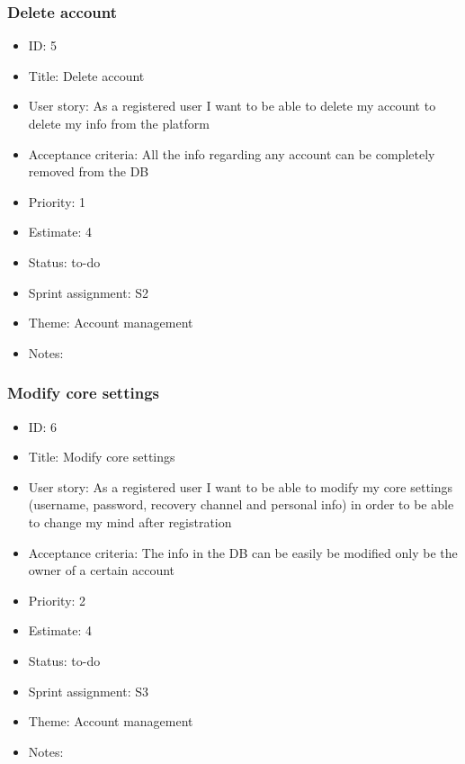 \subsubsection{Delete account}
\begin{itemize}
	\item ID: 5
	\item Title: Delete account
	\item User story: As a registered user I want to be able to delete my account to delete my info from the platform
	\item Acceptance criteria: All the info regarding any account can be completely removed from the DB
	\item Priority: 1
	\item Estimate: 4
	\item Status: to-do
	\item Sprint assignment: S2
	\item Theme: Account management
	\item Notes:
\end{itemize}

\subsubsection{Modify core settings}
\begin{itemize}
	\item ID: 6
	\item Title: Modify core settings
	\item User story: As a registered user I want to be able to modify my core settings (username, password, recovery channel and personal info) in order to be able to change my mind after registration
	\item Acceptance criteria: The info in the DB can be easily be modified only be the owner of a certain account
	\item Priority: 2
	\item Estimate: 4
	\item Status: to-do
	\item Sprint assignment: S3
	\item Theme: Account management
	\item Notes:
\end{itemize}

